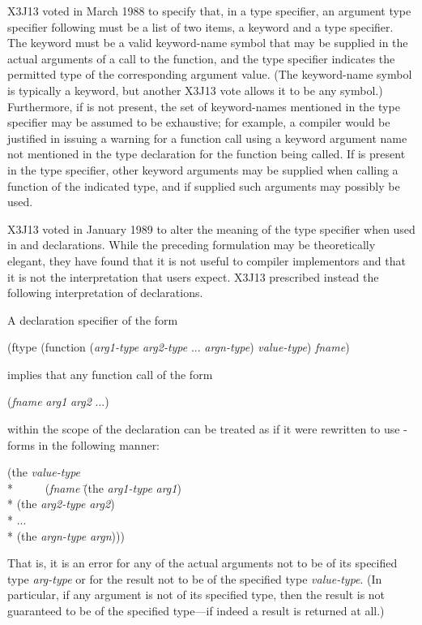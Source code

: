 \begin{flushdesc}
\begin{newer}
X3J13 voted in March 1988 
to specify that, in a  type specifier,
an argument type specifier following 
must be a list of two items, a keyword and a type specifier.
The keyword must be a valid keyword-name symbol that may be
supplied in the actual arguments of a call to the function,
and the type specifier indicates the permitted type of
the corresponding argument value.  (The keyword-name symbol
is typically a keyword,
but another X3J13 vote 
allows it to be any symbol.)
Furthermore, if  is not present,
the set of keyword-names mentioned in the 
type specifier may be assumed to be exhaustive;
for example, a compiler would be justified in issuing
a warning for a function call using a keyword argument name
not mentioned in the type declaration for the function being called.
If 
is present in the 
type specifier, other keyword arguments may be supplied
when calling a function of the indicated type, and if supplied such
arguments may possibly be used.
\end{newer}

\begin{new}
X3J13 voted in January 1989
to alter the meaning of the
 type specifier when used in  and 
declarations.  While the preceding formulation may be theoretically
elegant, they have found that it is not useful to compiler implementors
and that it is not the interpretation that users expect.  X3J13 prescribed instead the
following interpretation of declarations.

A declaration specifier of the form
\begin{lisp}
(ftype (function (\emph{arg1-type} \emph{arg2-type} ... \emph{argn-type}) \emph{value-type}) \emph{fname})
\end{lisp}
implies that any function call of the form
\begin{lisp}
(\emph{fname} \emph{arg1} \emph{arg2} ...)
\end{lisp}
within the scope of the declaration can be treated as if it were
rewritten to use -forms in the following manner:
\begin{lisp}
(the \emph{value-type} \\*
~~~~~(\emph{fname} \=(the \emph{arg1-type} \emph{arg1}) \\*
                  \>(the \emph{arg2-type} \emph{arg2}) \\*
                  \>... \\*
                  \>(the \emph{argn-type} \emph{argn})))
\end{lisp}
That is, it is an error for any of the actual arguments not to be of
its specified type \emph{arg-type} or for the result not to be of the specified
type \emph{value-type}.  (In particular, if any argument is not of
its specified type, then the result is not guaranteed to be of the
specified type---if indeed a result is returned at all.)


\end{new}
\end{flushdesc}
